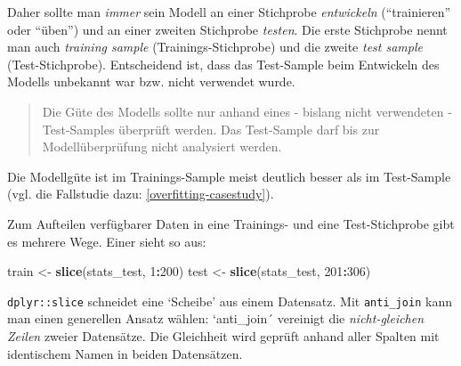 \documentclass[12pt,ngerman,]{book}
\makeatletter
\newenvironment{Shaded}{\begin{snugshade}}{\end{snugshade}}
\newcommand{\KeywordTok}[1]{\textcolor[rgb]{0.13,0.29,0.53}{\textbf{#1}}}
\newcommand{\DataTypeTok}[1]{\textcolor[rgb]{0.13,0.29,0.53}{#1}}
\newcommand{\DecValTok}[1]{\textcolor[rgb]{0.00,0.00,0.81}{#1}}
\newcommand{\StringTok}[1]{\textcolor[rgb]{0.31,0.60,0.02}{#1}}
\newcommand{\CommentTok}[1]{\textcolor[rgb]{0.56,0.35,0.01}{\textit{#1}}}
\newcommand{\OtherTok}[1]{\textcolor[rgb]{0.56,0.35,0.01}{#1}}
\newcommand{\OperatorTok}[1]{\textcolor[rgb]{0.81,0.36,0.00}{\textbf{#1}}}
\newcommand{\NormalTok}[1]{#1}
\newenvironment{kframe}{%
\medskip{}
\setlength{\fboxsep}{.8em}
 \def\at@end@of@kframe{}%
 \ifinner\ifhmode%
  \def\at@end@of@kframe{\end{minipage}}%
  \begin{minipage}{\columnwidth}%
 \fi\fi%
 \def\FrameCommand##1{\hskip\@totalleftmargin \hskip-\fboxsep
 \colorbox{shadecolor}{##1}\hskip-\fboxsep
     \hskip-\linewidth \hskip-\@totalleftmargin \hskip\columnwidth}%
 \MakeFramed {\advance\hsize-\width
   \@totalleftmargin\z@ \linewidth\hsize
   \@setminipage}}%
 {\par\unskip\endMakeFramed%
 \at@end@of@kframe}
\renewenvironment{Shaded}{\begin{kframe}}{\end{kframe}}
\theoremstyle{definition}
\theoremstyle{definition}
\theoremstyle{remark}
\makeatother
\begin{document}
Daher sollte man \emph{immer} sein Modell an einer Stichprobe
\emph{entwickeln} (``trainieren'' oder ``üben'') und an einer zweiten
Stichprobe \emph{testen}. Die erste Stichprobe nennt man auch
\emph{training sample} (Trainings-Stichprobe) und die zweite \emph{test
sample} (Test-Stichprobe). Entscheidend ist, dass das Test-Sample beim
Entwickeln des Modells unbekannt war bzw. nicht verwendet wurde.

\begin{quote}
Die Güte des Modells sollte nur anhand eines - bislang nicht verwendeten
- Test-Samples überprüft werden. Das Test-Sample darf bis zur
Modellüberprüfung nicht analysiert werden.
\end{quote}

Die Modellgüte ist im Trainings-Sample meist deutlich besser als im
Test-Sample (vgl. die Fallstudie dazu: \ref{overfitting-casestudy}).

Zum Aufteilen verfügbarer Daten in eine Trainings- und eine
Test-Stichprobe gibt es mehrere Wege. Einer sieht so aus:

\begin{Shaded}
\begin{Highlighting}[]
\NormalTok{train <-}\StringTok{ }\KeywordTok{slice}\NormalTok{(stats_test, }\DecValTok{1}\OperatorTok{:}\DecValTok{200}\NormalTok{)}
\NormalTok{test <-}\StringTok{ }\KeywordTok{slice}\NormalTok{(stats_test, }\DecValTok{201}\OperatorTok{:}\DecValTok{306}\NormalTok{)}
\end{Highlighting}
\end{Shaded}

\texttt{dplyr::slice} schneidet eine `Scheibe' aus einem Datensatz. Mit
\texttt{anti\_join} kann man einen generellen Ansatz wählen:
`anti\_join´ vereinigt die \emph{nicht-gleichen Zeilen} zweier
Datensätze. Die Gleichheit wird geprüft anhand aller Spalten mit
identischem Namen in beiden Datensätzen.

\begin{Shaded}
\end{Shaded}
\end{document}
